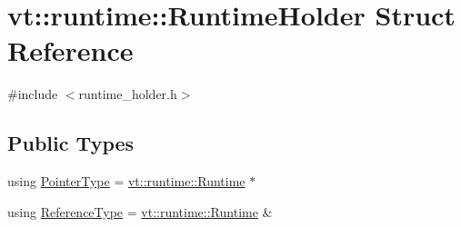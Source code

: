 \hypertarget{structvt_1_1runtime_1_1_runtime_holder}{}\section{vt\+:\+:runtime\+:\+:Runtime\+Holder Struct Reference}
\label{structvt_1_1runtime_1_1_runtime_holder}


{\ttfamily \#include $<$runtime\+\_\+holder.\+h$>$}

\subsection*{Public Types}
\begin{DoxyCompactItemize}
\item 
using \hyperlink{structvt_1_1runtime_1_1_runtime_holder_a9740e8aa7487fcf38b67a7e160d7b046}{Pointer\+Type} = \hyperlink{structvt_1_1runtime_1_1_runtime}{vt\+::runtime\+::\+Runtime} $\ast$
\item 
using \hyperlink{structvt_1_1runtime_1_1_runtime_holder_a45aaa245b06497cfce58452b0d64b3fa}{Reference\+Type} = \hyperlink{structvt_1_1runtime_1_1_runtime}{vt\+::runtime\+::\+Runtime} \&
\end{DoxyCompactItemize}
